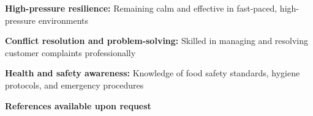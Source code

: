 	\begin{onecolentry}
		\textbf{High-pressure resilience:} Remaining calm and effective in fast-paced, high-pressure environments
	\end{onecolentry}
	
	\vspace{0.2 cm}
	
	\begin{onecolentry}
		\textbf{Conflict resolution and problem-solving:} Skilled in managing and resolving customer complaints professionally
	\end{onecolentry}
	
	\vspace{0.2 cm}
	
	\begin{onecolentry}
		\textbf{Health and safety awareness:} Knowledge of food safety standards, hygiene protocols, and emergency procedures
	\end{onecolentry}
	
	\vspace{0.2 cm}
	
	\begin{onecolentry}
		\begin{center}
			\textbf{References available upon request}
		\end{center}
	\end{onecolentry}
	
	
